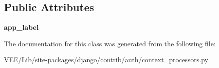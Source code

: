 \subsection*{Public Attributes}
\begin{DoxyCompactItemize}
\item 
\mbox{\label{classdjango_1_1contrib_1_1auth_1_1context__processors_1_1_perm_lookup_dict_a19ddf2a401778d26a7449f9c2ef99211}} 
{\bfseries app\+\_\+label}
\end{DoxyCompactItemize}


The documentation for this class was generated from the following file\+:\begin{DoxyCompactItemize}
\item 
V\+E\+E/\+Lib/site-\/packages/django/contrib/auth/context\+\_\+processors.\+py\end{DoxyCompactItemize}
